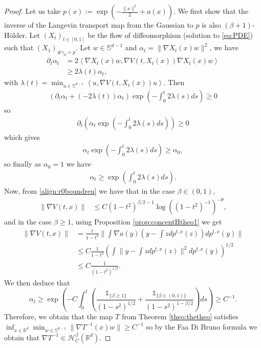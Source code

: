 \documentclass{article}
\begin{document}
\begin{proof}Let us take $p(x):=\exp\left(-\frac{\|x\|^2}{2}+a(x)\right)$. We first show that the inverse of the Langevin transport map from the Gaussian to $p$ is also $(\beta+1)$-Hölder. Let $(X_t)_{t\in [0,1]}$ be the flow of diffeomorphism (solution to \eqref{eq:PDE}) such that $(X_1)_{\# \gamma_d =p}$. 
Let $w\in \mathbb{S}^{d-1}$ and $\alpha_t=\|\nabla X_t(x) w\|^2$, we have
\begin{align*}
    \partial_t \alpha_t &= 2\left\langle \nabla X_t(x)w, \nabla V(t,X_t(x)) \nabla X_t(x)w\right\rangle\\
    & \geq 2 \lambda(t)\alpha_t,
\end{align*}
with $\lambda(t) = \min_{u\in \mathbb{S}^{d-1}} \left\langle  u, \nabla V(t,X_t(x)) u\right\rangle$. Then
\begin{align*}
    (\partial_t \alpha_t + (-2 \lambda(t))\alpha_t)\exp(-\int_0^t 2\lambda(s)ds)\geq 0
\end{align*}
so 
\begin{align*}
    \partial_t (\alpha_t\exp(-\int_0^t 2\lambda(s)ds))\geq 0
\end{align*}
which gives
\begin{align*}
    \alpha_t\exp(-\int_0^t 2\lambda(s)ds)\geq \alpha_0,
\end{align*}
so finally as $\alpha_0=1$ we have 
\begin{align*}
    \alpha_t\geq \exp(\int_0^t 2\lambda(s)ds).
\end{align*}
Now, from \eqref{align:r0boundreu} we have that in the case $\beta\in (0,1)$,
\begin{align*}
    \|\nabla V(t,x)\|&\leq C(1-t^2)^{\beta/2-1}\log((1-t^2)^{-1})^{-\theta},
\end{align*}
and in the case $\beta\geq 1$, using Proposition \ref{prop:concentHtheo1} we get
\begin{align*}
    \|\nabla V(t,x)\| & = \frac{t}{1-t^2}\|\int \nabla a(y)\left(y-\int z dp^{t,x}(z)\right)dp^{t,x}(y)\|\\
    & \leq C\frac{1}{1-t^2}\left(\int \|y-\int z dp^{t,x}(z)\|^2dp^{t,x}(y)\right)^{1/2}\\
    & \leq C\frac{1}{(1-t^2)^{1/2}}.
\end{align*}
We then deduce that
$$\alpha_t\geq \exp(-C\int_0^t \left(\frac{\mathds{1}_{\{\beta\geq1\}}}{(1-s^2)^{1/2}}+\frac{\mathds{1}_{\{\beta\in (0,1)\}}}{(1-s^2)^{1-\beta/2}}\right)ds) \geq C^{-1}.$$
Therefore, we obtain that the map $T$ from Theorem \ref{theo:thetheo} satisfies $\inf_{x\in \mathbb{R}^{d}}\min_{w\in \mathbb{S}^{d-1}} \|\nabla T^{-1}(x)w \|\geq C^{-1}$ so by the Faa Di Bruno formula we obtain that $\nabla T^{-1}\in \mathcal{H}^{\beta}_C   (\mathbb{R}^d)$.




\end{proof}
\end{document}
